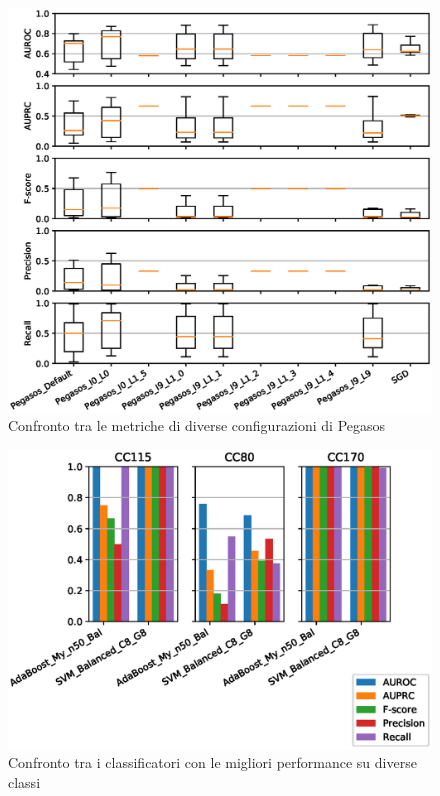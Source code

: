 \documentclass[12pt,a4paper,oneside,hidelinks]{report}
\begin{document}
\begin{figure}[hb]%
    \centering
    \includegraphics[scale = 0.80]{CC-Pegasos-level1.eps}%
    \caption{Confronto tra le metriche di diverse configurazioni di Pegasos}%
    \label{figure:liv1.3}%
\end{figure}

\vspace*{\fill}



\vspace*{\fill}

\begin{figure}[ht]%
    \centering
    \includegraphics[scale = 0.80]{CC-level2.eps}%
    \caption{Confronto tra i classificatori con le migliori performance su diverse classi}%
    \label{fig:liv2}%
\end{figure}
\end{document}
